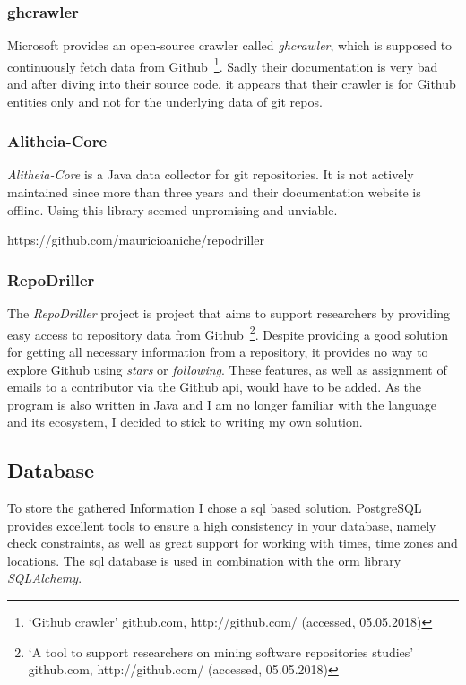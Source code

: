\subsubsection{ghcrawler}
Microsoft provides an open-source crawler called \emph{ghcrawler}, which is supposed to continuously fetch data from Github~\footnote{`Github crawler' github.com, http://github.com/ (accessed, 05.05.2018)}.
Sadly their documentation is very bad and after diving into their source code, it appears that their crawler is for Github entities only and not for the underlying data of git repos.

\subsubsection{Alitheia-Core}
\emph{Alitheia-Core} is a Java data collector for git repositories.
It is not actively maintained since more than three years and their documentation website is offline.
Using this library seemed unpromising and unviable.

https://github.com/mauricioaniche/repodriller
\subsubsection{RepoDriller}
The \emph{RepoDriller} project is project that aims to support researchers by providing easy access to repository data from Github~\footnote{`A tool to support researchers on mining software repositories studies' github.com, http://github.com/ (accessed, 05.05.2018)}.
Despite providing a good solution for getting all necessary information from a repository, it provides no way to explore Github using \emph{stars} or \emph{following}.
These features, as well as assignment of emails to a contributor via the Github \ac{api}, would have to be added.
As the program is also written in Java and I am no longer familiar with the language and its ecosystem, I decided to stick to writing my own solution.

\subsection{Database}\label{gitalizer-database}
To store the gathered Information I chose a \ac{sql} based solution.
PostgreSQL provides excellent tools to ensure a high consistency in your database, namely check constraints, as well as great support for working with times, time zones and locations.
The \ac{sql} database is used in combination with the \ac{orm} library \emph{SQLAlchemy}.

